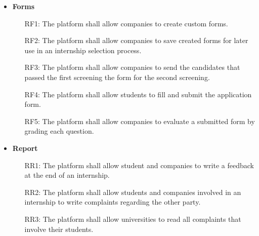 \documentclass[11pt,twoside]{article}
\begin{document}
\begin{itemize}
\item \textbf{Forms}
\begin{itemize}
\item[RF1:] The platform shall allow companies to create custom forms.
\item[RF2:] The platform shall allow companies to save created forms for later use in an internship selection process.
\item[RF3:] The platform shall allow companies to send the candidates that passed the first screening the form for the second screening.
\item[RF4:] The platform shall allow students to fill and submit the application form.
\item[RF5:] The platform shall allow companies to evaluate a submitted form by grading each question.
\end{itemize}
\item \textbf{Report}
\begin{itemize}
\item[RR1:] The platform shall allow student and companies to write a feedback at the end of an internship.
\item[RR2:] The platform shall allow students and companies involved in an internship to write complaints regarding the other party.
\item[RR3:] The platform shall allow universities to read all complaints that involve their students.
\end{itemize}
\end{itemize}
\end{document}
